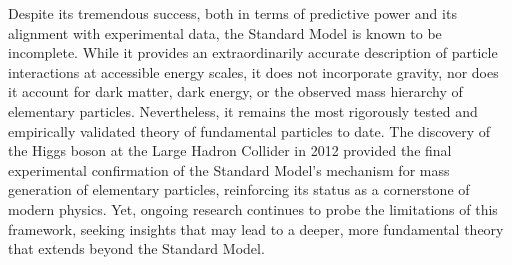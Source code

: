 Despite its tremendous success, both in terms of predictive power and its alignment with experimental data, the Standard Model is known to be incomplete. While it provides an extraordinarily accurate description of particle interactions at accessible energy scales, it does not incorporate gravity, nor does it account for dark matter, dark energy, or the observed mass hierarchy of elementary particles. Nevertheless, it remains the most rigorously tested and empirically validated theory of fundamental particles to date. The discovery of the Higgs boson at the Large Hadron Collider in 2012 provided the final experimental confirmation of the Standard Model’s mechanism for mass generation of elementary particles, reinforcing its status as a cornerstone of modern physics. Yet, ongoing research continues to probe the limitations of this framework, seeking insights that may lead to a deeper, more fundamental theory that extends beyond the Standard Model.











